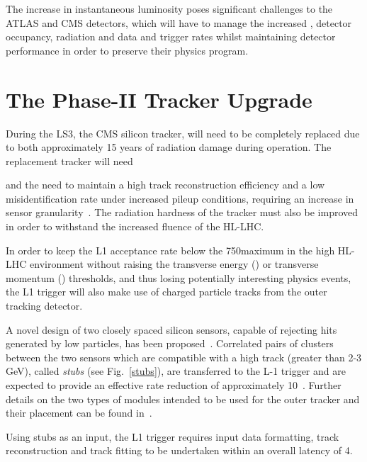 The increase in instantaneous luminosity poses significant challenges to the ATLAS and CMS detectors, which will have to manage the increased \PU, detector occupancy, radiation and data and trigger rates whilst maintaining detector performance in order to preserve their physics program.

\section{The Phase-II Tracker Upgrade}\label{sec:tk-upgrade}

During the LS3, the CMS silicon tracker, will need to be completely replaced due to both approximately 15 years of radiation damage during operation.
The replacement tracker will need 

 and the need to maintain a high track reconstruction efficiency and a low misidentification rate under increased pileup conditions, requiring an increase in sensor granularity~\cite{P2TrackerTDR}.
The radiation hardness of the tracker must also be improved in order to withstand the increased fluence of the HL-LHC.

In order to keep the L1 acceptance rate below the 750\kHz maximum in the high \PU HL-LHC environment without raising the transverse energy (\ET) or transverse momentum (\pT) thresholds, and thus losing potentially interesting physics events, the L1 trigger will also make use of charged particle tracks from the outer tracking detector.
 

A novel design of two closely spaced silicon sensors, capable of rejecting hits generated by low \pT particles, has been proposed~\cite{jjonespixel,markthesis}. Correlated pairs of clusters between the two sensors which are compatible with a high \pT track (greater than 2-3 GeV), called \textit{stubs} (see Fig.~\ref{stubs}), are transferred to the L-1 trigger and are expected to provide an effective rate reduction of approximately 10~\cite{mpessimperf,2dptmoduleconcept}. Further details on the two types of \pT modules intended to be used for the outer tracker and their placement can be found in~\cite{CMS_Upgrade_TP,P2TrackerTDR}.

Using stubs as an input, the L1 trigger requires input data formatting, track reconstruction and track fitting to be undertaken within an overall latency of 4\mus.  

